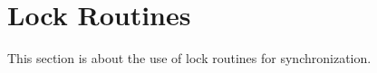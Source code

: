 \section{Lock Routines}
\label{sec:locks}

This section is about the use of lock routines for synchronization.
